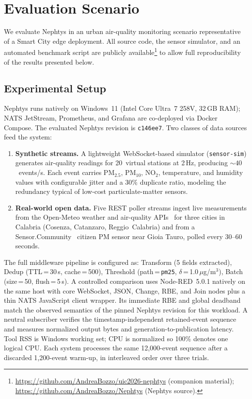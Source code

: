 \documentclass[conference]{IEEEtran}
\begin{document}
\section{Evaluation Scenario}

We evaluate Nephtys in an urban air-quality monitoring scenario representative of a Smart City edge deployment. All source code, the sensor simulator, and an automated benchmark script are publicly available\footnote{\sloppy\url{https://github.com/AndreaBozzo/uic2026-nephtys} (companion material); \url{https://github.com/AndreaBozzo/Nephtys} (Nephtys source).} to allow full reproducibility of the results presented below.

\subsection{Experimental Setup}

Nephtys runs natively on Windows~11 (Intel Core Ultra~7 258V, 32\,GB RAM); NATS JetStream, Prometheus, and Grafana are co-deployed via Docker Compose. The evaluated Nephtys revision is \texttt{c146ee7}. Two classes of data sources feed the system:

\begin{enumerate}
  \item \textbf{Synthetic streams.} A lightweight WebSocket-based simulator (\texttt{sensor-sim}) generates air-quality readings for 20~virtual stations at 2\,Hz, producing ${\sim}40$~events/s. Each event carries PM$_{2.5}$, PM$_{10}$, NO$_2$, temperature, and humidity values with configurable jitter and a 30\% duplicate ratio, modeling the redundancy typical of low-cost particulate-matter sensors.
  \item \textbf{Real-world open data.} Five REST poller streams ingest live measurements from the Open-Meteo weather and air-quality APIs~\cite{openmeteo2026} for three cities in Calabria (Cosenza, Catanzaro, Reggio~Calabria) and from a Sensor.Community~\cite{sensorcommunity2026} citizen PM sensor near Gioia Tauro, polled every 30--60\,seconds.
\end{enumerate}

The full middleware pipeline is configured as: Transform (5 fields extracted), Dedup (TTL\,=\,30\,s, cache\,=\,500), Threshold (path\,=\,\texttt{pm25}, $\delta$\,=\,1.0\,$\mu$g/m$^3$), Batch (size\,=\,50, flush\,=\,5\,s). A controlled comparison uses Node-RED~5.0.1 natively on the same host with core WebSocket, JSON, Change, RBE, and Join nodes plus a thin NATS JavaScript client wrapper. Its immediate RBE and global deadband match the observed semantics of the pinned Nephtys revision for this workload. A neutral subscriber verifies the timestamp-independent retained-event sequence and measures normalized output bytes and generation-to-publication latency. Tool RSS is Windows working set; CPU is normalized so 100\% denotes one logical CPU. Each system processes the same 12,000-event sequence after a discarded 1,200-event warm-up, in interleaved order over three trials.
\end{document}
